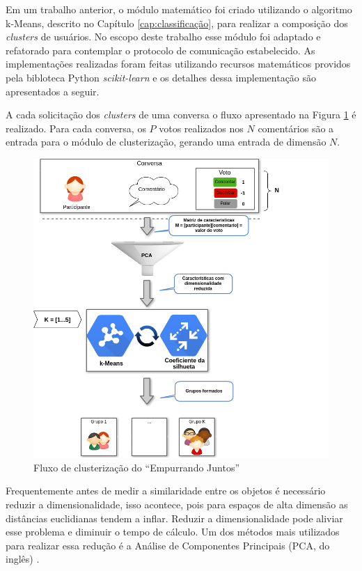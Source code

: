     Em um trabalho anterior, o módulo matemático foi criado utilizando o algoritmo k-Means, descrito no Capítulo \ref{cap:classificação},
    para realizar a composição dos \textit{clusters} de usuários. No escopo deste trabalho esse módulo foi adaptado e refatorado para contemplar
    o protocolo de comunicação estabelecido.
    As implementações realizadas foram feitas utilizando recursos matemáticos
    providos pela bibloteca Python \textit{scikit-learn}\footnotemark 
    e os detalhes dessa implementação são apresentados a seguir.
    
    
    A cada solicitação dos \textit{clusters} de uma conversa
    o fluxo apresentado na Figura \ref{fig:resumo_clusterizao_ej} é realizado.
    Para cada conversa, os $P$ votos realizados nos $N$ comentários são a entrada para o módulo de clusterização, 
    gerando uma entrada de dimensão $N$. 
    
    
    \begin{figure}[h!]
      \centering
      \includegraphics[scale=0.6]{figuras/resumo_clusterizao_ej.png}
      \caption{Fluxo de clusterização do ``Empurrando Juntos''}
      \label{fig:resumo_clusterizao_ej}
    \end{figure}
  

    Frequentemente antes de medir a similaridade entre os objetos é necessário
    reduzir a dimensionalidade, isso acontece, pois para espaços de alta dimensão as distâncias euclidianas
    tendem a inflar. Reduzir a dimensionalidade pode aliviar esse problema e diminuir o tempo de cálculo.
    Um dos métodos mais utilizados para realizar essa redução é a Análise de 
    Componentes Principais (PCA, do inglês) \cite{han2011data, sklearn}.

